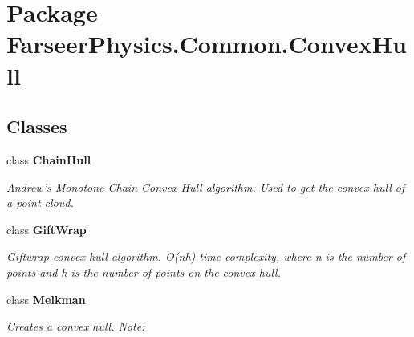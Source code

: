 \hypertarget{namespace_farseer_physics_1_1_common_1_1_convex_hull}{\section{Package Farseer\+Physics.\+Common.\+Convex\+Hull}
\label{namespace_farseer_physics_1_1_common_1_1_convex_hull}
}
\subsection*{Classes}
\begin{DoxyCompactItemize}
\item 
class {\bfseries Chain\+Hull}
\begin{DoxyCompactList}\small\item\em Andrew's Monotone Chain Convex Hull algorithm. Used to get the convex hull of a point cloud. \end{DoxyCompactList}\item 
class {\bfseries Gift\+Wrap}
\begin{DoxyCompactList}\small\item\em Giftwrap convex hull algorithm. O(nh) time complexity, where n is the number of points and h is the number of points on the convex hull. \end{DoxyCompactList}\item 
class {\bfseries Melkman}
\begin{DoxyCompactList}\small\item\em Creates a convex hull. Note\+: \end{DoxyCompactList}\end{DoxyCompactItemize}
